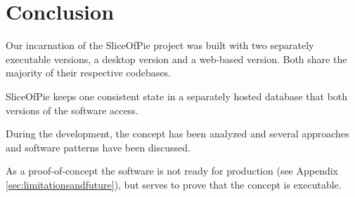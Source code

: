 \section{Conclusion}

Our incarnation of the SliceOfPie project was built with two separately executable versions, a desktop version
and a web-based version. Both share the majority of their respective codebases.

SliceOfPie keeps one consistent state in a separately hosted database that both versions of the software access.

During the development, the concept has been analyzed and several approaches and software patterns have been
discussed.

As a proof-of-concept the software is not ready for production (see Appendix \ref{sec:limitationsandfuture}), but
serves to prove that the concept is executable.